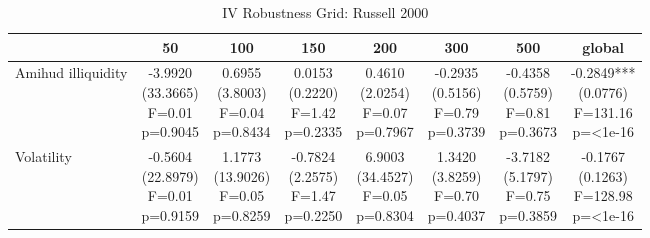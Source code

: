 \begin{table}[!htbp]\centering
\caption{IV Robustness Grid: Russell 2000}
\label{tab:iv_robustness_grid_r2000}
\begin{threeparttable}
\footnotesize
\setlength{\tabcolsep}{2.8pt}
\renewcommand{\arraystretch}{1.05}
\begin{tabular}{lccccccc}
\toprule
 & 50 & 100 & 150 & 200 & 300 & 500 & global \\
\midrule
Amihud illiquidity & \shortstack{-3.9920\\(33.3665)\\F=0.01\\p=0.9045} & \shortstack{0.6955\\(3.8003)\\F=0.04\\p=0.8434} & \shortstack{0.0153\\(0.2220)\\F=1.42\\p=0.2335} & \shortstack{0.4610\\(2.0254)\\F=0.07\\p=0.7967} & \shortstack{-0.2935\\(0.5156)\\F=0.79\\p=0.3739} & \shortstack{-0.4358\\(0.5759)\\F=0.81\\p=0.3673} & \shortstack{-0.2849***\\(0.0776)\\F=131.16\\p=<1e-16} \\
Volatility & \shortstack{-0.5604\\(22.8979)\\F=0.01\\p=0.9159} & \shortstack{1.1773\\(13.9026)\\F=0.05\\p=0.8259} & \shortstack{-0.7824\\(2.2575)\\F=1.47\\p=0.2250} & \shortstack{6.9003\\(34.4527)\\F=0.05\\p=0.8304} & \shortstack{1.3420\\(3.8259)\\F=0.70\\p=0.4037} & \shortstack{-3.7182\\(5.1797)\\F=0.75\\p=0.3859} & \shortstack{-0.1767\\(0.1263)\\F=128.98\\p=<1e-16} \\

\end{tabular}
\end{threeparttable}
\end{table}
